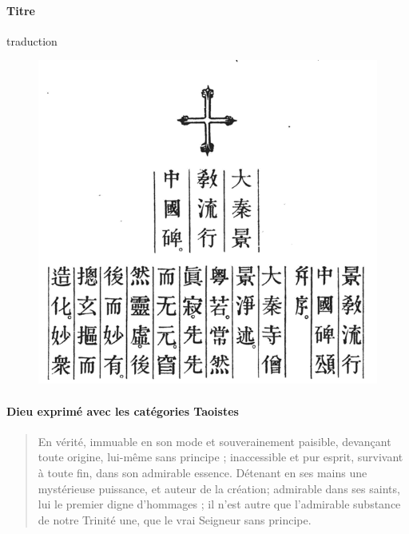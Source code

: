 \paragraph{Titre}
traduction  \cite{Havret:stelechretienne}
\begin{figure}
    \centering
    \includegraphics[width=\textwidth]{ChristologieCultureHistoire/Images/PremierParagrapheStele.png}
 
    \label{fig:my_label}
\end{figure}

\paragraph{Dieu exprimé avec les catégories Taoistes} 
\begin{quote}
    En vérité, immuable en son mode et souverainement paisible,
devançant toute origine,
lui-même sans principe ; inaccessible et
pur esprit, survivant à toute fin, dans son
admirable essence. Détenant en ses mains
une mystérieuse puissance, et auteur de la
création; admirable dans ses saints, lui le
premier digne d'hommages ; il n'est autre
que l'admirable substance de notre Trinité
une, que le vrai Seigneur sans principe.

\end{quote} 

